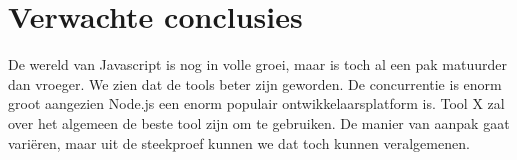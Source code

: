 \section{Verwachte conclusies}
\label{sec:verwachte_conclusies}

De wereld van Javascript is nog in volle groei, maar is toch al een pak matuurder dan vroeger. We zien dat de tools beter zijn geworden. De concurrentie is enorm groot aangezien Node.js een enorm populair ontwikkelaarsplatform is. Tool X zal over het algemeen de beste tool zijn om te gebruiken. De manier van aanpak gaat variëren, maar uit de steekproef kunnen we dat toch kunnen veralgemenen. 